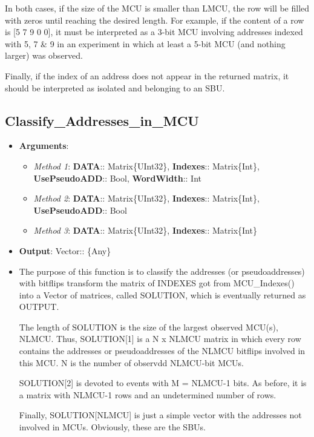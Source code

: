 \begin{itemize}
     In both cases, if the size of the MCU is smaller than LMCU, the row will be filled with zeros until
     reaching the desired length. For example, if the content of a row is [5 7 9 0 0], it must be interpreted
     as a 3-bit MCU involving addresses indexed with 5, 7 \& 9 in an experiment in which at least a 5-bit 
     MCU (and nothing larger) was observed.
     
 	Finally, if the index of an address does not appear in the returned matrix, it should be interpreted as  isolated and belonging to an SBU.
 	
 \end{itemize}
%
\subsection*{Classify\_Addresses\_in\_MCU}
%
\begin{itemize}
	\item \textbf{Arguments}: 
		\begin{itemize}
			\item \textit{Method 1}: \textbf{DATA}:: Matrix\{UInt32\}, 
			\textbf{Indexes}:: Matrix\{Int\}, 
			\textbf{UsePseudoADD}:: Bool, 
			\textbf{WordWidth}:: Int
			\item \textit{Method 2}: \textbf{DATA}:: Matrix\{UInt32\}, 
			\textbf{Indexes}:: Matrix\{Int\}, 
			\textbf{UsePseudoADD}:: Bool 
			\item \textit{Method 3}: \textbf{DATA}:: Matrix\{UInt32\}, 
			\textbf{Indexes}:: Matrix\{Int\}
		\end{itemize}
	\item \textbf{Output}: Vector:: \{Any\}
	\item The purpose of this function is to classify the addresses (or pseudoaddresses) with bitflips transform the matrix of INDEXES got from MCU\_Indexes() into a Vector of matrices, called SOLUTION, which is eventually returned as OUTPUT.
	 
	The length of SOLUTION is the size of the largest observed MCU(s), NLMCU. Thus, SOLUTION[1] is 	a N x NLMCU matrix in which every row contains the addresses or pseudoaddresses of the NLMCU 	bitflips involved in this MCU. N is the number of observdd NLMCU-bit MCUs.
	
	SOLUTION[2] is devoted to events with M = NLMCU-1 bits. As before, it is a matrix with NLMCU-1 	rows and an undetermined number of rows.
	
	Finally, SOLUTION[NLMCU] is just a simple vector with the addresses not involved in MCUs. Obviously, these are the SBUs.
\end{itemize}

